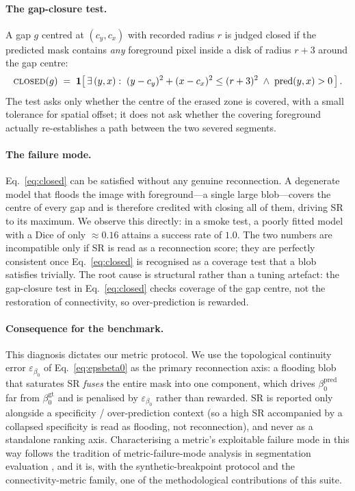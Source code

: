 \paragraph{The gap-closure test.} A gap $g$ centred at $(c_y, c_x)$ with
recorded radius $r$ is judged closed if the predicted mask contains
\emph{any} foreground pixel inside a disk of radius $r + 3$ around the gap
centre:
\begin{equation}
  \textsc{closed}(g)
  \;=\;
  \mathbf{1}\!\left[\,
    \exists\,(y,x):\;
    (y-c_y)^2 + (x-c_x)^2 \leq (r+3)^2
    \;\wedge\;
    \mathrm{pred}(y,x) > 0
  \,\right].
  \label{eq:closed}
\end{equation}
The test asks only whether the centre of the erased zone is covered, with a
small tolerance for spatial offset; it does not ask whether the covering
foreground actually re-establishes a path between the two severed segments.

\paragraph{The failure mode.} Eq.~\eqref{eq:closed} can be satisfied without
any genuine reconnection. A degenerate model that floods the image with
foreground---a single large blob---covers the centre of every gap and is
therefore credited with closing all of them, driving SR to its maximum. We
observe this directly: in a smoke test, a poorly fitted model with a Dice of
only $\approx 0.16$ attains a success rate of $1.0$. The two numbers are
incompatible only if SR is read as a reconnection score; they are perfectly
consistent once Eq.~\eqref{eq:closed} is recognised as a coverage test that a
blob satisfies trivially. The root cause is structural rather than a tuning
artefact: the gap-closure test in Eq.~\eqref{eq:closed} checks coverage of the
gap centre, not the restoration of connectivity, so over-prediction is
rewarded.

\paragraph{Consequence for the benchmark.} This diagnosis dictates our
metric protocol. We use the topological continuity error
$\varepsilon_{\beta_0}$ of Eq.~\eqref{eq:epsbeta0} as the primary reconnection
axis: a flooding blob that saturates SR \emph{fuses} the entire mask into one
component, which drives $\beta_0^{\text{pred}}$ far from $\beta_0^{\text{gt}}$
and is penalised by $\varepsilon_{\beta_0}$ rather than rewarded. SR is
reported only alongside a specificity / over-prediction context (so a high SR
accompanied by a collapsed specificity is read as flooding, not
reconnection), and never as a standalone ranking axis. Characterising a
metric's exploitable failure mode in this way follows the tradition of
metric-failure-mode analysis in segmentation evaluation
\cite{TODO_pixelwise,TODO_touchstone}, and it is, with the synthetic-breakpoint
protocol and the connectivity-metric family, one of the methodological
contributions of this suite.
